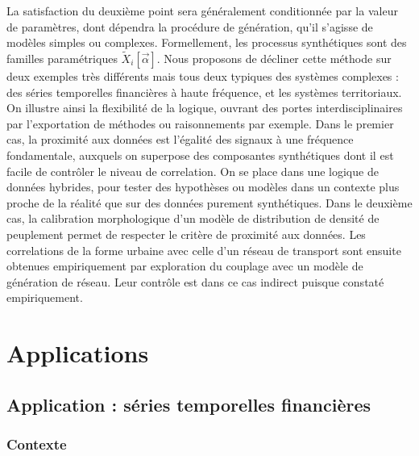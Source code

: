 La satisfaction du deuxième point sera généralement conditionnée par la valeur de paramètres, dont dépendra la procédure de génération, qu'il s'agisse de modèles simples ou complexes. Formellement, les processus synthétiques sont des familles paramétriques $\tilde{X}_i[\vec{\alpha}]$. Nous proposons de décliner cette méthode sur deux exemples très différents mais tous deux typiques des systèmes complexes : des séries temporelles financières à haute fréquence, et les systèmes territoriaux. On illustre ainsi la flexibilité de la logique, ouvrant des portes interdisciplinaires par l'exportation de méthodes ou raisonnements par exemple. Dans le premier cas, la proximité aux données est l'égalité des signaux à une fréquence fondamentale, auxquels on superpose des composantes synthétiques dont il est facile de contrôler le niveau de correlation. On se place dans une logique de données hybrides, pour tester des hypothèses ou modèles dans un contexte plus proche de la réalité que sur des données purement synthétiques. Dans le deuxième cas, la calibration morphologique d'un modèle de distribution de densité de peuplement permet de respecter le critère de proximité aux données. Les correlations de la forme urbaine avec celle d'un réseau de transport sont ensuite obtenues empiriquement par exploration du couplage avec un modèle de génération de réseau. Leur contrôle est dans ce cas indirect puisque constaté empiriquement.


\section{Applications}



\subsection{Application : séries temporelles financières}


\subsubsection{Contexte}

